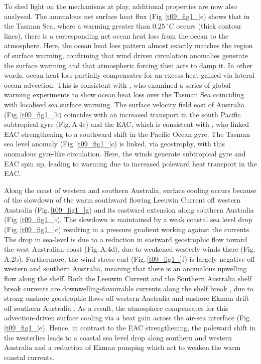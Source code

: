 \documentclass[draft,linenumbers]{agujournal2018}
\begin{document}
To shed light on the mechanisms at play, additional properties are now also analysed. The anomalous net surface heat flux (Fig.\,\ref{t09_fig1_}e) shows that in the Tasman Sea, where a warming greater than $0.25\ ^{\circ}C$ occurs (thick contour lines), there is a corresponding net ocean heat loss from the ocean to the atmosphere. Here, the ocean heat loss pattern almost exactly matches the region of surface warming, confirming that wind driven circulation anomalies generate the surface warming and that atmospheric forcing then acts to damp it. In other words, ocean heat loss partially compensates for an excess heat gained via lateral ocean advection. This is consistent with \citet{Cai2005}, who examined a series of global warming experiments to show ocean heat loss over the Tasman Sea coinciding with localised sea surface warming. The surface velocity field east of Australia (Fig.\,\ref{t09_fig1_}h) coincides with an increased transport in the south Pacific subtropical gyre (Fig.\,A.4c) and the EAC, which is consistent with \citet{Hill2011}, who linked EAC strengthening to a southward shift in the Pacific Ocean gyre. The Tasman sea level anomaly (Fig.\,\ref{t09_fig1_}c) is linked, via geostrophy, with this anomalous gyre-like circulation. Here, the winds generate subtropical gyre and EAC spin up, leading to warming due to increased poleward heat transport in the EAC.

Along the coast of western and southern Australia, surface cooling occurs because of the slowdown of the warm southward flowing Leeuwin Current off western Australia (Fig.\,\ref{t09_fig1_}g) and its eastward extension along southern Australia (Fig.\,\ref{t09_fig1_}i). The slowdown is maintained by a weak coastal sea level drop (Fig.\,\ref{t09_fig1_}c) resulting in a pressure gradient working against the currents. The drop in sea-level is due to a reduction in eastward geostrophic flow toward the west Australian coast (Fig.\,A.4d), due to weakened westerly winds there (Fig.\,A.2b). Furthermore, the wind stress curl (Fig.\,\ref{t09_fig1_}f) is largely negative off western and southern Australia, meaning that there is an anomalous upwelling flow along the shelf. Both the Leeuwin Current and the Southern Australia shelf break currents are downwelling-favourable currents along the shelf break \citep{Furue2017,Middleton2007}, due to strong onshore geostrophic flows off western Australia \citep{Godfrey1985} and onshore Ekman drift off southern Australia \citep{Middleton2007}. As a result, the atmosphere compensates for this advection-driven surface cooling via a heat gain across the air-sea interface (Fig.\,\ref{t09_fig1_}e). Hence, in contrast to the EAC strengthening, the poleward shift in the westerlies leads to a coastal sea level drop along southern and western Australia and a reduction of Ekman pumping which act to weaken the warm coastal currents.
\end{document}
